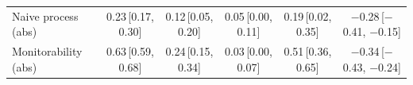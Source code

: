 \begin{tabular}{lccccc}
Naive process (abs) & 0.23\,{\scriptsize[0.17, 0.30]} & 0.12\,{\scriptsize[0.05, 0.20]} & 0.05\,{\scriptsize[0.00, 0.11]} & 0.19\,{\scriptsize[0.02, 0.35]} & \ensuremath{-}0.28\,{\scriptsize[\ensuremath{-}0.41, \ensuremath{-}0.15]} \\
Monitorability (abs) & 0.63\,{\scriptsize[0.59, 0.68]} & 0.24\,{\scriptsize[0.15, 0.34]} & 0.03\,{\scriptsize[0.00, 0.07]} & 0.51\,{\scriptsize[0.36, 0.65]} & \ensuremath{-}0.34\,{\scriptsize[\ensuremath{-}0.43, \ensuremath{-}0.24]} \\
\bottomrule
\end{tabular}
